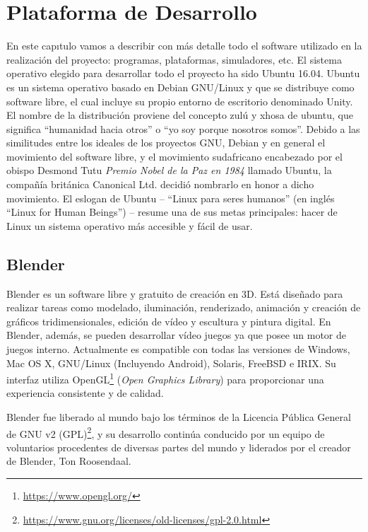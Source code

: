 \chapter{Plataforma de Desarrollo}
\label{ch:PlataformaDesarrollo}

En este capıtulo vamos a describir con más detalle todo el software utilizado en la realización del proyecto: programas, plataformas, simuladores, etc. El sistema operativo elegido para desarrollar todo el proyecto ha sido Ubuntu 16.04. Ubuntu es un sistema operativo basado en Debian GNU/Linux y que se distribuye como software libre, el cual incluye su propio entorno de escritorio denominado Unity. El nombre de la distribución proviene del concepto zulú y xhosa de ubuntu, que significa “humanidad hacia otros” o “yo soy porque nosotros somos”. Debido a las similitudes entre los ideales de los proyectos GNU, Debian y en general el movimiento del software libre, y el movimiento sudafricano encabezado por el obispo Desmond Tutu \textit{Premio Nobel de la Paz en 1984} llamado Ubuntu, la compañía británica Canonical Ltd. decidió nombrarlo en honor a dicho movimiento. El eslogan de Ubuntu – “Linux para seres humanos” (en inglés “Linux for Human Beings”) – resume una de sus metas principales: hacer de Linux un sistema operativo más accesible y fácil de usar.

\section{Blender}
\label{sec:plat_blender}

Blender\cite{blender} es un software libre y gratuito de creación en 3D. Está diseñado para realizar tareas como modelado, iluminación, renderizado, animación y creación de gráficos tridimensionales, edición de vídeo y escultura y pintura digital. En Blender, además, se pueden desarrollar vídeo juegos ya que posee un motor de juegos interno. Actualmente es compatible con todas las versiones de Windows, Mac OS X, GNU/Linux (Incluyendo Android), Solaris, FreeBSD e IRIX. Su interfaz utiliza OpenGL\footnote{\url{https://www.opengl.org/}} (\textit{Open Graphics Library}) para proporcionar una experiencia consistente y de calidad.

Blender fue liberado al mundo bajo los términos de la Licencia Pública General de GNU v2 (GPL)\footnote{\url{https://www.gnu.org/licenses/old-licenses/gpl-2.0.html}}, y su desarrollo continúa conducido por un equipo de voluntarios procedentes de diversas partes del mundo y liderados por el creador de Blender, Ton Roosendaal. 

